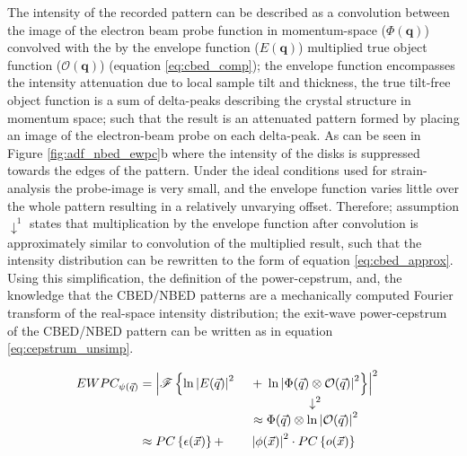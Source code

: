 The intensity of the recorded pattern can be described as a convolution between the image of the electron beam probe function in momentum-space ($\Phi(\mathbf{q})$) convolved with the by the envelope function ($E(\mathbf{q})$) multiplied true object function ($\mathcal{O}(\mathbf{q})$) (equation \ref{eq:cbed_comp}); the envelope function encompasses the intensity attenuation due to local sample tilt and thickness, the true tilt-free object function is a sum of delta-peaks describing the crystal structure in momentum space; such that the result is an attenuated pattern formed by placing an image of the electron-beam probe on each delta-peak. As can be seen in Figure \ref{fig:adf_nbed_ewpc}b where the intensity of the disks is suppressed towards the edges of the pattern. Under the ideal conditions used for strain-analysis the probe-image is very small, and the envelope function varies little over the whole pattern resulting in a relatively unvarying offset. Therefore; assumption $\downarrow^1$ states that multiplication by the envelope function after convolution is approximately similar to convolution of the multiplied result, such that the intensity distribution can be rewritten to the form of equation \ref{eq:cbed_approx}. Using this simplification, the definition of the power-cepstrum, and, the knowledge that the CBED/NBED patterns are a mechanically computed Fourier transform of the real-space intensity distribution; the exit-wave power-cepstrum of the CBED/NBED pattern can be written as in equation \ref{eq:cepstrum_unsimp}.

\begin{alignat}{3}
	EWPC_{\psi(\vec{q})} & =\left| \mathscr{F}\left\{\ln{\left| E(\vec{q}) \right|^2}\right.\right. &  & +\left. \left.\ln{\left| \Phi(\vec{q}) \otimes \mathcal{O}(\vec{q}) \right|^2}\right\} \right|^2 & \label{eq:cepstrum_unsimp} \\
	\ArrowBetweenLines*[\downarrow^2\hspace{-2cm}]%
	                     &                                                                          &  & \approx \Phi(\vec{q}) \otimes \ln{\left| \mathcal{O}(\vec{q}) \right|^2}                         &                            \\
	                     & \approx PC\left\{ \epsilon(\vec{x})\right\}+                             &  & \left| \phi(\vec{x})\right|^2 \cdot PC\left\{ o(\vec{x})\right\}                                 & \label{eq:cepstrum_simp}
\end{alignat}

